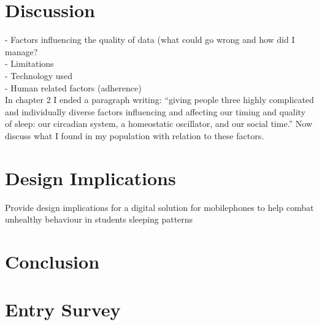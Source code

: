 \documentclass[12pt]{article} %
\begin{document}

\section{Discussion}
- Factors influencing the quality of data (what could go wrong and how did I manage?\\
- Limitations\\
- Technology used\\
- Human related factors (adherence)\\

In chapter 2 I ended a paragraph writing: ``giving people three highly complicated and individually diverse factors influencing and affecting our timing and quality of sleep: our circadian system, a homeostatic oscillator, and our social time.'' Now discuss what I found in my population with relation to these factors.

\section{Design Implications}
Provide design implications for a digital solution for mobilephones to help combat unhealthy behaviour in students sleeping patterns

\section{Conclusion}


\newpage
%



\newpage
\appendix
\section{Entry Survey} \label{sec:survey}
\end{document}
